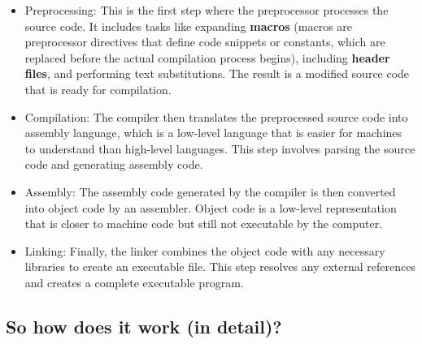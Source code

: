 \documentclass[a4paper,12pt]{article}
\begin{document}
\begin{itemize}
    \item Preprocessing: This is the first step where the preprocessor processes the source code. It includes tasks like expanding \textbf{macros} (macros are preprocessor directives that define code snippets or constants, which are replaced before the actual compilation process begins), including \textbf{header files}, and performing text substitutions. The result is a modified source code that is ready for compilation.
    \item Compilation: The compiler then translates the preprocessed source code into assembly language, which is a low-level language that is easier for machines to understand than high-level languages. This step involves parsing the source code and generating assembly code.
    \item Assembly: The assembly code generated by the compiler is then converted into object code by an assembler. Object code is a low-level representation that is closer to machine code but still not executable by the computer.
    \item Linking: Finally, the linker combines the object code with any necessary libraries to create an executable file. This step resolves any external references and creates a complete executable program.
\end{itemize}

\begin{center}
\end{center}

\subsection{So how does it work (in detail)?}
\end{document}
